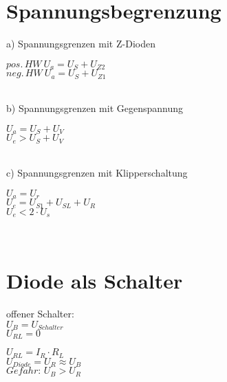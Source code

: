     \section{Spannungsbegrenzung}\label{sec:spannungsbegrenzung}
    a) Spannungsgrenzen mit Z-Dioden\\
    \begin{minipage}{0.4\columnwidth}
        $pos.\, HW\: U_a=U_S+U_{Z2}$\\
        $neg.\, HW\: U_a=U_S+U_{Z1}$\\
    \end{minipage}
    \begin{minipage}{0.4\columnwidth}
    \end{minipage}\\
    b) Spannungsgrenzen mit Gegenspannung\\
    \begin{minipage}{0.4\columnwidth}
        $U_a=U_S+U_V$\\
        $U_e>U_S+U_V$\\
    \end{minipage}
    \begin{minipage}{0.4\columnwidth}
    \end{minipage}\\
    c) Spannungsgrenzen mit Klipperschaltung\\
    \begin{minipage}{0.4\columnwidth}
        $U_a=U_r$\\
        $U_e=U_{S1}+U_{SL}+U_R$\\
        $U_e<2\cdot U_s$\\
    \end{minipage}
    \begin{minipage}{0.4\columnwidth}
    \end{minipage}\\

    \pagebreak %
    \section{Diode als Schalter}

    \begin{minipage}{0.2\columnwidth}
        offener Schalter:\\
        $U_B=U_{Schalter}$\\
        $U_{RL}=0$
    \end{minipage}
    \begin{minipage}{0.5\columnwidth}
    \end{minipage}
    \begin{minipage}{0.3\columnwidth}
        $U_{RL}=I_R\cdot R_L$\\
        $U_{Diode}=U_R\approx U_B$\\
        $Gefahr:\, U_B>U_R$
    \end{minipage}

